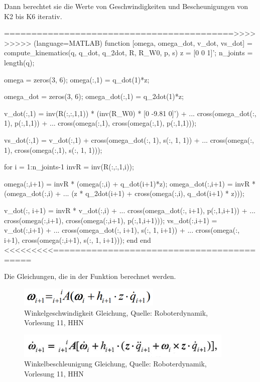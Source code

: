 Dann berechtet sie die Werte von Geschwindigkeiten und Bescheunigungen von K2 bis K6 iterativ.

==========================================>>>>>>>>> (language=MATLAB)
	function [omega, omega_dot, v_dot, vs_dot] = compute_kinematics(q, q_dot, q_2dot, R, R_W0, p, s)
		z = [0 0 1]';
		n_joints = length(q);

		omega = zeros(3, 6);
		omega(:,1) = q_dot(1)*z;
		
		omega_dot = zeros(3, 6);
		omega_dot(:,1) = q_2dot(1)*z;
		
		
		v_dot(:,1) = inv(R(:,:,1,1)) * (inv(R_W0) * [0 -9.81 0]') + ...
			cross(omega_dot(:, 1), p(:,1,1)) + ...
			cross(omega(:,1), cross(omega(:,1), p(:,1,1))); 

		vs_dot(:,1) = v_dot(:,1) + cross(omega_dot(:, 1), s(:, 1, 1)) + ...
			cross(omega(:, 1), cross(omega(:,1), s(:, 1, 1))); 
		
		for i = 1:n_joints-1
			invR = inv(R(:,:,1,i));

			omega(:,i+1) = invR * (omega(:,i) + q_dot(i+1)*z);
			omega_dot(:,i+1) = invR * (omega_dot(:,i) + ...
				(z * q_2dot(i+1) + cross(omega(:,i), q_dot(i+1) * z)));

			v_dot(:, i+1) = invR * v_dot(:,i) + ...
				cross(omega_dot(:, i+1), p(:,1,i+1)) + ...
				cross(omega(:,i+1), cross(omega(:,i+1), p(:,1,i+1)));
			vs_dot(:,i+1) = v_dot(:,i+1) + ...
				cross(omega_dot(:, i+1), s(:, 1, i+1)) + ...
				cross(omega(:, i+1), cross(omega(:,i+1), s(:, 1, i+1)));
		end
	end
<<<<<<<<<==========================================


	Die Gleichungen, die in der Funktion berechnet werden.

	\begin{figure}[!htbp]
		\centering
		\includegraphics[width=1\linewidth]{grafic/omega_gleichung}
		\caption{Winkelgeschwindigkeit Gleichung, Quelle: Roboterdynamik, Vorlesung 11, HHN}
		\label{fig:omega_gleichung}
	\end{figure}

	\begin{figure}[!htbp]
		\centering
		\includegraphics[width=1\linewidth]{grafic/omega_dot_gleichung}
		\caption{Winkelbeschleunigung Gleichung, Quelle: Roboterdynamik, Vorlesung 11, HHN}
		\label{fig:omega_dot_gleichung}
	\end{figure}

